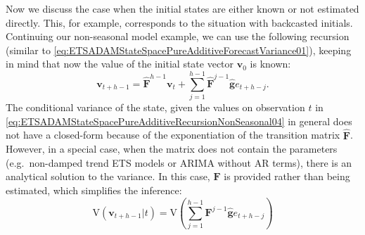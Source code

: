 \documentclass[]{book}
\theoremstyle{definition}
\theoremstyle{definition}
\theoremstyle{definition}
\theoremstyle{definition}
\theoremstyle{remark}
\begin{document}
Now we discuss the case when the initial states are either known or not estimated directly. This, for example, corresponds to the situation with backcasted initials. Continuing our non-seasonal model example, we can use the following recursion (similar to \eqref{eq:ETSADAMStateSpacePureAdditiveForecastVariance01}), keeping in mind that now the value of the initial state vector \(\mathbf{v}_0\) is known:
\begin{equation}
    \mathbf{v}_{t+h-1} = \hat{\mathbf{F}}^{h-1} \mathbf{v}_{t} + \sum_{j=1}^{h-1} \hat{\mathbf{F}}^{j-1} \hat{\mathbf{g}} e_{t+h-j} .
  \label{eq:ETSADAMStateSpacePureAdditiveRecursionNonSeasonal04}
\end{equation}
The conditional variance of the state, given the values on observation \(t\) in \eqref{eq:ETSADAMStateSpacePureAdditiveRecursionNonSeasonal04} in general does not have a closed-form because of the exponentiation of the transition matrix \(\hat{\mathbf{F}}\). However, in a special case, when the matrix does not contain the parameters (e.g.~non-damped trend ETS models or ARIMA without AR terms), there is an analytical solution to the variance. In this case, \(\mathbf{F}\) is provided rather than being estimated, which simplifies the inference:
\begin{equation}
    \mathrm{V}(\mathbf{v}_{t+h-1} | t) = \mathrm{V}\left(\sum_{j=1}^{h-1} \mathbf{F}^{j-1} \hat{\mathbf{g}} e_{t+h-j}\right)
  \label{eq:ETSADAMStateSpacePureAdditiveVariance01}
\end{equation}
\end{document}
